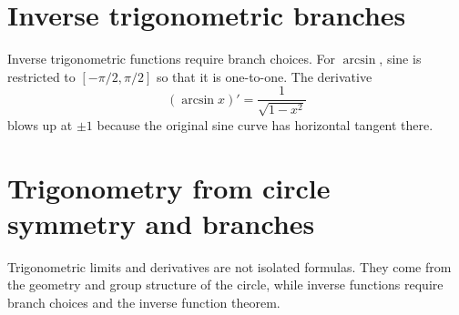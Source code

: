 \section{Inverse trigonometric branches}

Inverse trigonometric functions require branch choices.  For \(\arcsin\), sine is restricted to \([-\pi/2,\pi/2]\) so that it is one-to-one.  The derivative
\[
  (\arcsin x)'=\frac1{\sqrt{1-x^2}}
\]
blows up at \(\pm1\) because the original sine curve has horizontal tangent there.

\section{Trigonometry from circle symmetry and branches}

Trigonometric limits and derivatives are not isolated formulas.  They come from the geometry and group structure of the circle, while inverse functions require branch choices and the inverse function theorem.

